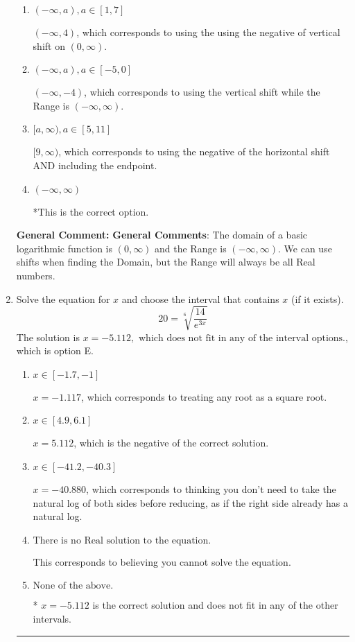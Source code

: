 \documentclass{extbook}[14pt]
\newcommand{\litem}[1]{\item #1

\rule{\textwidth}{0.4pt}}
\begin{document}
\begin{enumerate}
{\begin{enumerate}[label=\Alph*.]
$[-4, \infty)$, which corresponds to using the flipped Domain AND including the endpoint.
\item \( (-\infty, a), a \in [1, 7] \)

$(-\infty, 4)$, which corresponds to using the using the negative of vertical shift on $(0, \infty)$.
\item \( (-\infty, a), a \in [-5, 0] \)

$(-\infty, -4)$, which corresponds to using the vertical shift while the Range is $(-\infty, \infty)$.
\item \( [a, \infty), a \in [5, 11] \)

$[9, \infty)$, which corresponds to using the negative of the horizontal shift AND including the endpoint.
\item \( (-\infty, \infty) \)

*This is the correct option.
\end{enumerate}

\textbf{General Comment:} \textbf{General Comments}: The domain of a basic logarithmic function is $(0, \infty)$ and the Range is $(-\infty, \infty)$. We can use shifts when finding the Domain, but the Range will always be all Real numbers.
}
\litem{
 Solve the equation for $x$ and choose the interval that contains $x$ (if it exists).
\[  20 = \sqrt[6]{\frac{14}{e^{3x}}} \]The solution is \( x = -5.112, \text{ which does not fit in any of the interval options.} \), which is option E.\begin{enumerate}[label=\Alph*.]
\item \( x \in [-1.7, -1] \)

$x = -1.117$, which corresponds to treating any root as a square root.
\item \( x \in [4.9, 6.1] \)

$x = 5.112$, which is the negative of the correct solution.
\item \( x \in [-41.2, -40.3] \)

$x = -40.880$, which corresponds to thinking you don't need to take the natural log of both sides before reducing, as if the right side already has a natural log.
\item \( \text{There is no Real solution to the equation.} \)

This corresponds to believing you cannot solve the equation.
\item \( \text{None of the above.} \)

* $x = -5.112$ is the correct solution and does not fit in any of the other intervals.
\end{enumerate}

}
\end{enumerate}
\end{document}
